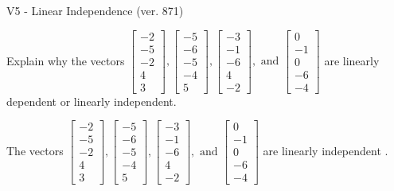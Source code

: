 \begin{exercise}
  \begin{exerciseTitle}V5 - Linear Independence (ver. 871)\end{exerciseTitle}
  \begin{exerciseStatement}
    Explain why the vectors \(\left[\begin{array}{r}
-2 \\
-5 \\
-2 \\
4 \\
3
\end{array}\right] , \left[\begin{array}{r}
-5 \\
-6 \\
-5 \\
-4 \\
5
\end{array}\right] , \left[\begin{array}{r}
-3 \\
-1 \\
-6 \\
4 \\
-2
\end{array}\right] , \text{ and } \left[\begin{array}{r}
0 \\
-1 \\
0 \\
-6 \\
-4
\end{array}\right]\) are linearly dependent or linearly independent.	


  \end{exerciseStatement}
  \begin{exerciseAnswer}
   The vectors \(\left[\begin{array}{r}
-2 \\
-5 \\
-2 \\
4 \\
3
\end{array}\right] , \left[\begin{array}{r}
-5 \\
-6 \\
-5 \\
-4 \\
5
\end{array}\right] , \left[\begin{array}{r}
-3 \\
-1 \\
-6 \\
4 \\
-2
\end{array}\right] , \text{ and } \left[\begin{array}{r}
0 \\
-1 \\
0 \\
-6 \\
-4
\end{array}\right]\) are 
  	 linearly independent  .
  


  \end{exerciseAnswer}
\end{exercise}